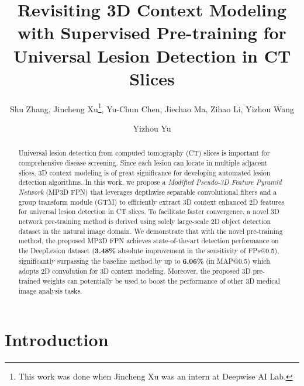 \documentclass[runningheads]{llncs}
\begin{document}
\title{Revisiting 3D Context Modeling with Supervised Pre-training for Universal Lesion Detection in CT Slices}

\author{Shu Zhang,
Jincheng Xu\thanks{This work was done when Jincheng Xu was an intern at Deepwise AI Lab.},
Yu-Chun Chen,
Jiechao Ma,
Zihao Li,
Yizhou Wang
\and Yizhou Yu
}


\maketitle

\begin{abstract}


Universal lesion detection from computed tomography (CT) slices is important for comprehensive disease screening. 
Since each lesion can locate in multiple adjacent slices, 3D context modeling is of great significance for developing automated lesion detection algorithms. 
In this work, we propose a \textit{Modified Pseudo-3D Feature Pyramid Network} (MP3D FPN) that leverages depthwise separable convolutional filters and a group transform module (GTM) to efficiently extract 3D context enhanced 2D features for universal lesion detection in CT slices.
To facilitate faster convergence, a novel 3D network pre-training method is derived using solely large-scale 2D object detection dataset in the natural image domain. 
We demonstrate that with the novel pre-training method, the proposed MP3D FPN achieves state-of-the-art detection performance on the DeepLesion dataset (\textbf{3.48\%} absolute improvement in the sensitivity of FPs@0.5), significantly surpassing the baseline method by up to \textbf{6.06\%} (in MAP@0.5) which adopts 2D convolution for 3D context modeling. 
Moreover, the proposed 3D pre-trained weights can potentially be used to boost the performance of other 3D medical image analysis tasks.


\end{abstract}
\section{Introduction}
\end{document}
